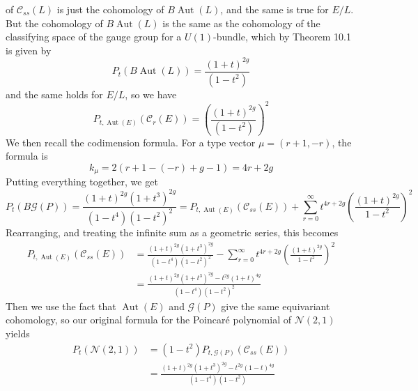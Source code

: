 \documentclass[psamsfonts, 12pt]{amsart}
\theoremstyle{definition}
\theoremstyle{remark}
\DeclareMathOperator{\Aut}{Aut}
\begin{document}
of $\mathscr{C}_{ss}(L)$ is just the cohomology of $B\Aut(L)$, and the same
is true for $E/L$. But the cohomology of $B\Aut(L)$ is the same as the cohomology
of the classifying space of the gauge group for a $U(1)$-bundle, which by
Theorem 10.1 is given by
\[
P_t(B\Aut(L)) = \frac{(1+t)^{2g}}{(1-t^2)}
\]
and the same holds for $E/L$, so we have
\[
P_{t,\Aut(E)}(\mathscr{C}_r(E)) = \left(\frac{(1+t)^{2g}}{(1-t^2)}\right)^2
\]
We then recall the codimension formula. For a type vector $\mu = (r+1,-r)$, the
formula is
\[
k_\mu = 2(r+1-(-r) + g - 1) = 4r + 2g
\]
Putting everything together, we get
\[
P_t(B\mathscr{G}(P)) = \frac{(1+t)^{2g}(1+t^3)^{2g}}{(1-t^4)(1-t^2)^2}
= P_{t,\Aut(E)}(\mathscr{C}_{ss}(E)) +
\sum_{r=0}^\infty t^{4r+2g}\left(\frac{(1+t)^{2g}}{1-t^2}\right)^2
\]
Rearranging, and treating the infinite sum as a geometric series, this becomes
\begin{align*}
P_{t,\Aut(E)}(\mathscr{C}_{ss}(E)) &= \frac{(1+t)^{2g}(1+t^3)^{2g}}{(1-t^4)(1-t^2)^2}
- \sum_{r=0}^\infty t^{4r+2g}\left(\frac{(1+t)^{2g}}{1-t^2}\right)^2 \\
&= \frac{(1+t)^{2g}(1+t^3)^{2g} - t^{2g}(1+t)^{4g}}{(1-t^4)(1-t^2)^2}
\end{align*}
Then we use the fact that $\Aut(E)$ and $\mathscr{G}(P)$ give the same
equivariant cohomology, so our original formula for the Poincar\'e polynomial of
$\mathcal{N}(2,1)$ yields
\begin{align*}
P_t(\mathcal{N}(2,1)) &= (1-t^2)P_{t,\mathscr{G}(P)}(\mathscr{C}_{ss}(E)) \\
&= \frac{(1+t)^{2g}(1+t^3)^{2g} - t^{2g}(1-t)^{4g}}{(1-t^4)(1-t^2)}
\end{align*}
%
\newpage
%
\nocite{*}
%
\printbibliography
%
\end{document}
